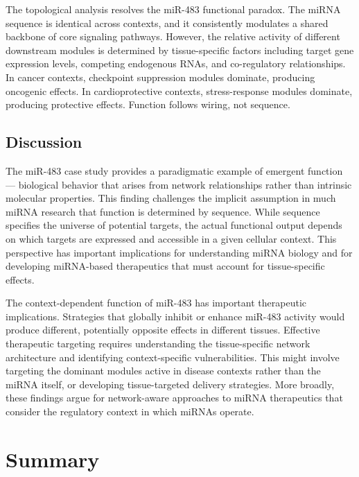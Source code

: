 The topological analysis resolves the miR-483 functional paradox. The miRNA sequence is identical across contexts, and it consistently modulates a shared backbone of core signaling pathways. However, the relative activity of different downstream modules is determined by tissue-specific factors including target gene expression levels, competing endogenous RNAs, and co-regulatory relationships. In cancer contexts, checkpoint suppression modules dominate, producing oncogenic effects. In cardioprotective contexts, stress-response modules dominate, producing protective effects. Function follows wiring, not sequence.

\subsection{Discussion}

The miR-483 case study provides a paradigmatic example of emergent function --- biological behavior that arises from network relationships rather than intrinsic molecular properties. This finding challenges the implicit assumption in much miRNA research that function is determined by sequence. While sequence specifies the universe of potential targets, the actual functional output depends on which targets are expressed and accessible in a given cellular context. This perspective has important implications for understanding miRNA biology and for developing miRNA-based therapeutics that must account for tissue-specific effects.

The context-dependent function of miR-483 has important therapeutic implications. Strategies that globally inhibit or enhance miR-483 activity would produce different, potentially opposite effects in different tissues. Effective therapeutic targeting requires understanding the tissue-specific network architecture and identifying context-specific vulnerabilities. This might involve targeting the dominant modules active in disease contexts rather than the miRNA itself, or developing tissue-targeted delivery strategies. More broadly, these findings argue for network-aware approaches to miRNA therapeutics that consider the regulatory context in which miRNAs operate.

\section{Summary}

